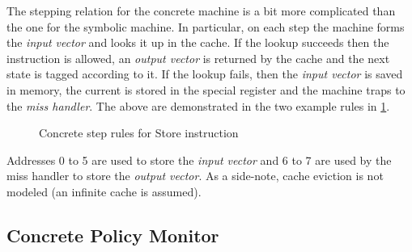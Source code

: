 The stepping relation for the concrete machine is a bit more
complicated than the one for the symbolic machine. In particular, on
each step the machine forms the \emph{input vector} and looks it up in
the cache. If the lookup succeeds then the instruction is allowed, an
\emph{output vector} is returned by the cache and the next state is
tagged according to it.  If the lookup fails, then the \emph{input
  vector} is saved in memory, the current \pc is stored in the special
register \epc and the machine traps to the \emph{miss handler}.  The
above are demonstrated in the two example rules in \cref{cstep_store}.

\begin{figure}[htb]
\bigskip
{}
\caption{Concrete step rules for Store instruction}
\label{cstep_store}
\end{figure}

Addresses 0 to 5 are used to store the \emph{input vector} and 6 to 7 are used
by the miss handler to store the \emph{output vector}. As a side-note, cache
eviction is not modeled (an infinite cache is assumed).

\subsection{Concrete Policy Monitor}\label{sec:concrete_policy}

